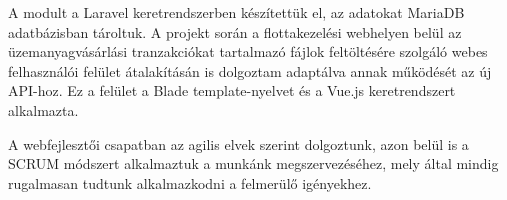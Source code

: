 A modult a Laravel keretrendszerben készítettük el, az adatokat MariaDB adatbázisban tároltuk. A projekt során a flottakezelési webhelyen belül az üzemanyagvásárlási tranzakciókat tartalmazó fájlok feltöltésére szolgáló webes felhasználói felület átalakításán is dolgoztam adaptálva annak működését az új API-hoz. Ez a felület a Blade template-nyelvet és a Vue.js keretrendszert alkalmazta.

A webfejlesztői csapatban az agilis elvek szerint dolgoztunk, azon belül is a SCRUM módszert alkalmaztuk a munkánk megszervezéséhez, mely által mindig rugalmasan tudtunk alkalmazkodni a felmerülő igényekhez.